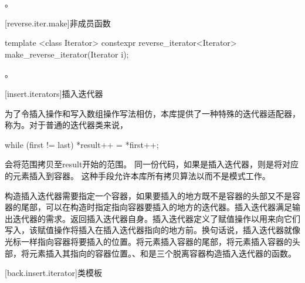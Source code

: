 \begin{itemdescr}
\pnum
\returns
{}。
\end{itemdescr}

[reverse.iter.make]{非成员函数}

%
\begin{itemdecl}
template <class Iterator>
  constexpr reverse_iterator<Iterator> make_reverse_iterator(Iterator i);
\end{itemdecl}

\begin{itemdescr}
\pnum
\returns
{}。
\end{itemdescr}

[insert.iterators]{插入迭代器}

\pnum
为了令插入操作和写入数组操作写法相仿，本库提供了一种特殊的迭代器适配器，称为。对于普通的迭代器类来说，

\begin{codeblock}
while (first != last) *result++ = *first++;
\end{codeblock}

会将范围拷贝至result开始的范围。
同一份代码，如果是插入迭代器，则是将对应的元素插入到容器。
这种手段允许本库所有拷贝算法以而不是模式工作。

\pnum
构造插入迭代器需要指定一个容器，如果要插入的地方既不是容器的头部又不是容器的尾部，可以在构造时指定指向容器要插入的地方的迭代器。插入迭代器满足输出迭代器的需求。返回插入迭代器自身。插入迭代器定义了赋值操作以用来向它们写入，该赋值操作将插入在插入迭代器指向的地方前。换句话说，插入迭代器就像光标一样指向容器将要插入的位置。将元素插入容器的尾部，将元素插入容器的头部，将元素插入其指向的容器位置。、和是三个脱离容器构造插入迭代器的函数。

[back.insert.iterator]{类模板}

